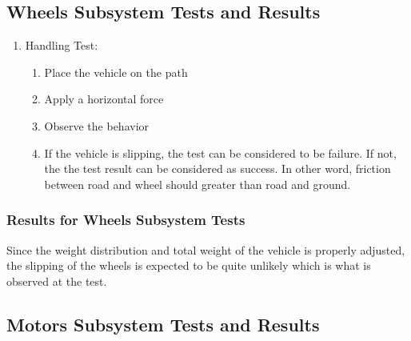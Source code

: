 \documentclass[a4paper,12pt]{article}
\begin{document}
	




\newpage

\subsection{Wheels Subsystem Tests and Results} 


\begin{enumerate}

\item {Handling Test:} 

\begin{enumerate}

\item  Place the vehicle on the path

\item Apply a horizontal force

\item Observe the behavior 

\item If the vehicle is slipping, the test can be considered to be failure. If not, the the test result can be considered as success. In other word, friction between road and wheel should greater than road and ground. 


\end{enumerate}

\end{enumerate}
\subsubsection*{Results for Wheels Subsystem Tests }
	Since the weight distribution and total weight of the vehicle is properly adjusted, the slipping of the wheels is expected to be quite unlikely which is what is observed at the test.
	
	
\subsection {Motors Subsystem Tests and Results} 
\end{document}
